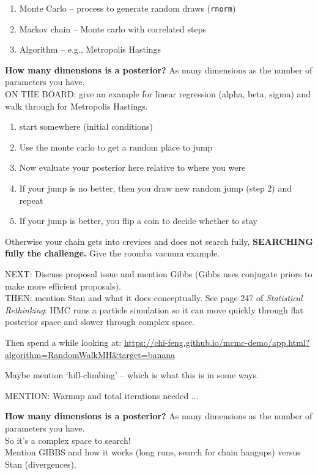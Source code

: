 \documentclass[11pt]{article}
\begin{document}
\begin{enumerate}
\item Monte Carlo -- process to generate random draws (\verb|rnorm|)
\item Markov chain -- Monte carlo with correlated steps
\item Algorithm -- e.g., Metropolis Hastings
\end{enumerate}

{\bf How many dimensions is a posterior?} As many dimensions as the number of parameters you have. \\

ON THE BOARD: give an example for linear regression (alpha, beta, sigma) and walk through for Metropolis Hastings. \\

\begin{enumerate}
\item start somewhere (initial conditions)
\item Use the monte carlo to get a random place to jump
\item Now evaluate your posterior here relative to where you were
\item If your jump is no better, then you draw new random jump (step 2) and repeat
\item If your jump is better, you flip a coin to decide whether to stay 
\end{enumerate}
 Otherwise your chain gets into crevices and does not search fully, {\bf SEARCHING fully the challenge.} Give the roomba vacuum example.  

NEXT: Discuss proposal issue and mention Gibbs (Gibbs uses conjugate priors to make more efficient proposals).\\ %

THEN: mention Stan and what it does conceptually. See page 247 of \emph{Statistical Rethinking}: HMC runs a particle simulation so it can move quickly through flat posterior space and slower through complex space. 

Then spend a while looking at: \url{https://chi-feng.github.io/mcmc-demo/app.html?algorithm=RandomWalkMH&target=banana}

Maybe mention `hill-climbing' -- which is what this is in some ways. 

MENTION: Warmup and total iterations needed ... 

{\bf How many dimensions is a posterior?} As many dimensions as the number of parameters you have. \\
So it's a complex space to search! \\
Mention GIBBS and how it works (long runs, search for chain hangups) versus Stan (divergences).\\ 
\end{document}
